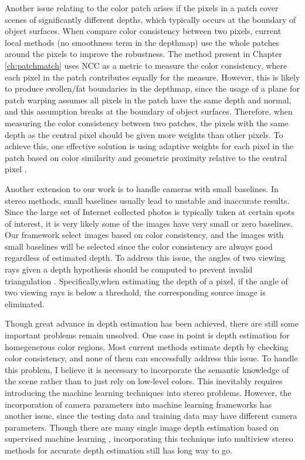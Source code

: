 Another issue relating to the color patch arises if the pixels in a patch cover scenes of significantly different depths, which typically occurs at the boundary of object surfaces. 
When compare color consistency between two pixels, current local methods (\ie no smoothness term in the depthmap) use the whole patches around the pixels to improve the robustness.
The method present in Chapter \ref{ch:patchmatch} uses NCC as a metric to measure the color consistency, where each pixel in the patch contributes equally for the measure.
However, this is likely to produce swollen/fat boundaries in the depthmap, since the usage of a plane for patch warping assumes all pixels in the patch have the same depth and normal, and this assumption breaks at the boundary of object surfaces. Therefore, when measuring the color consistency between two patches, the pixels with the same depth as the central pixel should be given more weights than other pixels. 
To achieve this, one effective solution is using adaptive weights for each pixel in the patch based on color similarity and geometric proximity relative to the central pixel \cite{Yoon06adaptivesupport_weight}. 

Another extension to our work is to handle cameras with small baselines. In stereo methods, small baselines usually lead to unstable and inaccurate results. Since the large set of Internet collected photos is typically taken at certain spots of interest, it is very likely some of the images have very small or zero baselines. Our framework select images based on color consistency, and the images with small baselines will be selected since the color consistency are always good regardless of estimated depth. To address this issue, the angles of two viewing rays given a depth hypothesis should be computed to prevent invalid triangulation \cite{Gallup08}. Specifically,when estimating the depth of a pixel, if the angle of two viewing rays is below a threshold, the corresponding source image is eliminated.

Though great advance in depth estimation has been achieved, there are still some important problems remain unsolved. One case in point is depth estimation for homegenerous color regions. 
Most current methods estimate depth by checking color consistency, and none of them can successfully address this issue.  
To handle this problem, I believe it is necessary to incorporate the semantic knowledge of the scene rather than to just rely on low-level colors. This inevitably requires introducing the machine learning techniques into stereo problems. However, the incorporation of camera parameters into machine learning frameworks has another issue, since the testing data and training data may have different camera parameters. Though there are many single image depth estimation based on supervised machine learning \cite{Hoiem_CGRAPH2005,Saxena_IJCV2008,eigen2014depth,Liu2014,zhuo2015indoor}, incorporating this technique into multiview stereo methods for accurate depth estimation still has long way to go.


